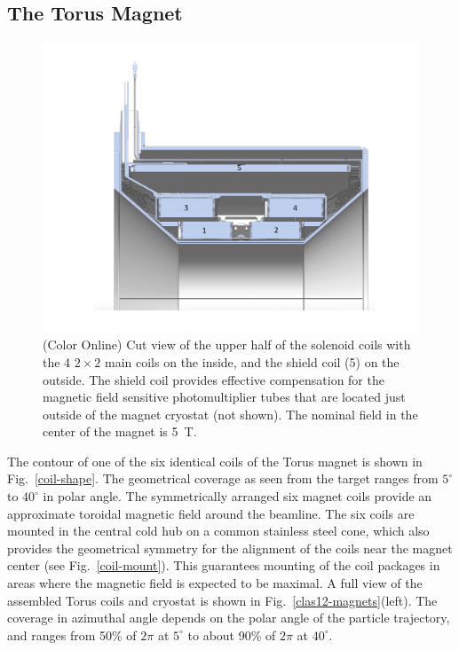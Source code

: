 \documentclass[final,3p,twocolumn]{elsarticle}
\begin{document}
\subsection{The Torus Magnet}
\label{torus}
\begin{figure}[htbp!]
\centerline{\includegraphics[width=1.3\columnwidth]{Solenoid.pdf}}
\caption{(Color Online) Cut view of the upper half of the solenoid coils with the 4 $2 \times 2$ main coils on the inside, and the shield
coil (5) on the outside. The shield coil provides effective compensation for the magnetic field sensitive photomultiplier 
tubes that are located just outside of the magnet cryostat (not shown). The nominal field in the center of the magnet is 5~T.}
\label{solenoid-coils}
\end{figure}
The contour of one of the six identical coils of the Torus magnet is shown in Fig.~\ref{coil-shape}. The geometrical
coverage as seen from the target ranges from $5^\circ$ to $40^\circ$ in polar angle. The symmetrically arranged six
magnet coils provide an approximate toroidal magnetic field around the beamline. The six coils are mounted in the
central cold hub on a common stainless steel cone, which also provides the geometrical symmetry for the alignment of
the coils near the magnet center (see Fig.~\ref{coil-mount}). This guarantees mounting of the coil packages in areas
where the magnetic field is expected to be maximal. A full view of the assembled Torus coils and cryostat is shown in
Fig.~\ref{clas12-magnets}(left). The coverage in azimuthal angle depends on the polar angle of the particle trajectory,
and ranges from 50\% of $2\pi$ at $5^\circ$ to about 90\% of $2\pi$ at $40^\circ$.
\end{document}
